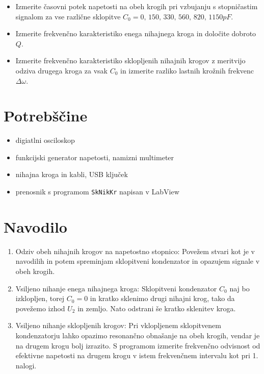 \documentclass[12pt]{report}
\begin{document}
\begin{itemize}
  \item Izmerite časovni potek napetosti na obeh krogih pri vzbujanju s stopničastim signalom za vse različne sklopitve $C_0 = 0,\, 150,\, 330,\, 560,\, 820,\, 1150 \si{pF}$. 
  \item Izmerite frekvenčno karakteristiko enega nihajnega kroga in določite dobroto $Q$. 
  \item Izmerite frekvenčno karakteristiko sklopljenih nihajnih krogov z meritvijo odziva drugega kroga za vsak $C_0$ in izmerite razliko lastnih krožnih frekvenc $\Delta \omega$. 
\end{itemize}


\begingroup
\let\clearpage\relax

\chapter*{Potrebščine}
\begin{itemize}
  \item digiatlni osciloskop
  \item funkcijski generator napetosti, namizni multimeter
  \item nihajna kroga in kabli, USB ključek
  \item prenosnik s programom \verb+SkNikKr+ napisan v LabView
\end{itemize}

\chapter*{Navodilo}

\begin{enumerate}
  \item Odziv obeh nihajnih krogov na napetostno stopnico: Povežem stvari kot je v navodilih in potem spreminjam sklopitveni kondenzator in opazujem signale v obeh krogih. 
  \item Vsiljeno nihanje enega nihajnega kroga: Sklopitveni kondenzator $C_0$ naj bo izklopljen, torej $C_0 = 0$ in kratko sklenimo drugi nihajni krog, tako da povežemo izhod $U_2$ in zemljo. Nato odstrani še kratko sklenitev kroga. 
  \item Vsiljeno nihanje sklopljenih krogov: Pri vklopljenem sklopitvenem kondenzatorju lahko opazimo resonančno obnašanje na obeh krogih, vendar je na drugem krogu bolj izrazito. S programom izmerite frekvenčno odvisnost od efektivne napetosti na drugem krogu v istem frekvenčnem intervalu kot pri 1. nalogi. 
\end{enumerate}
\end{document}

